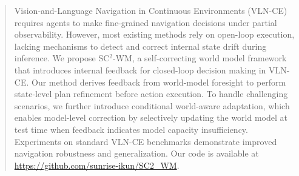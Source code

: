 \documentclass{article}
\theoremstyle{plain}
\theoremstyle{definition}
\theoremstyle{remark}
\begin{document}



\printAffiliationsAndNotice{}  %

\begin{abstract}
Vision-and-Language Navigation in Continuous Environments (VLN-CE) requires agents to make fine-grained navigation decisions under partial observability.
However, most existing methods rely on open-loop execution, lacking mechanisms to detect and correct internal state drift during inference.
We propose SC$^{2}$-WM, a self-correcting world model framework that introduces internal feedback for closed-loop decision making in VLN-CE.
Our method derives feedback from world-model foresight to perform state-level plan refinement before action execution.
To handle challenging scenarios, we further introduce conditional world-aware adaptation, which enables model-level correction by selectively updating the world model at test time when feedback indicates model capacity insufficiency.
Experiments on standard VLN-CE benchmarks demonstrate improved navigation robustness and generalization. Our code is available at \url{https://github.com/sunrise-ikun/SC2_WM}. 
\end{abstract}
\end{document}

